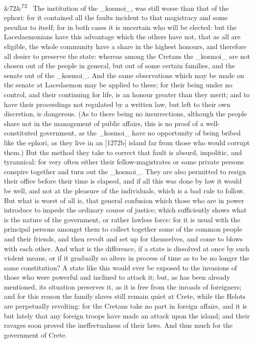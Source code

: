 \documentclass[12pt]{article}
\newcommand{\para}[1][]{\par\noindent\ifx&#1&\else\textsuperscript{\footnotesize #1}~\fi}
\begin{document}
\para[72] The institution of the \_kosmoi\_, was still worse than that of the ephori: for it contained all the faults incident to that magistracy and some peculiar to itself; for in both cases it is uncertain who will be elected: but the Lacedaemonians have this advantage which the others have not, that as all are eligible, the whole community have a share in the highest honours, and therefore all desire to preserve the state: whereas among the Cretans the \_kosmoi\_ are not chosen out of the people in general, but out of some certain families, and the senate out of the \_kosmoi\_. And the same observations which may be made on the senate at Lacedaemon may be applied to these; for their being under no control, and their continuing for life, is an honour greater than they merit; and to have their proceedings not regulated by a written law, but left to their own discretion, is dangerous. (As to there being no insurrections, although the people share not in the management of public affairs, this is no proof of a well-constituted government, as the \_kosmoi\_ have no opportunity of being bribed like the ephori, as they live in an [1272b] island far from those who would corrupt them.) But the method they take to correct that fault is absurd, impolitic, and tyrannical: for very often either their fellow-magistrates or some private persons conspire together and turn out the \_kosmoi\_. They are also permitted to resign their office before their time is elapsed, and if all this was done by law it would be well, and not at the pleasure of the individuals, which is a bad rule to follow. But what is worst of all is, that general confusion which those who are in power introduce to impede the ordinary course of justice; which sufficiently shows what is the nature of the government, or rather lawless force: for it is usual with the principal persons amongst them to collect together some of the common people and their friends, and then revolt and set up for themselves, and come to blows with each other. And what is the difference, if a state is dissolved at once by such violent means, or if it gradually so alters in process of time as to be no longer the same constitution? A state like this would ever be exposed to the invasions of those who were powerful and inclined to attack it; but, as has been already mentioned, its situation preserves it, as it is free from the inroads of foreigners; and for this reason the family slaves still remain quiet at Crete, while the Helots are perpetually revolting: for the Cretans take no part in foreign affairs, and it is but lately that any foreign troops have made an attack upon the island; and their ravages soon proved the ineffectualness of their laws. And thus much for the government of Crete.
\end{document}
